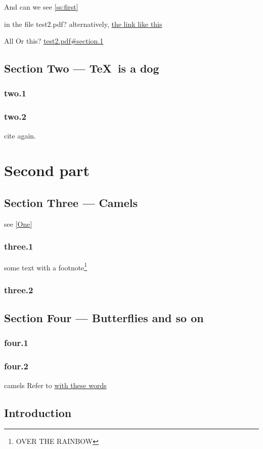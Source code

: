 \documentclass[11pt]{book}
\begin{document}
And can we  see \autoref{ss:first}

in the file test2.pdf? alternatively,
\href{file:test2.pdf#subsection.1.2}{the link like this}

All Or this? \url{test2.pdf#section.1}

\newpage
\section{Section Two --- \TeX\ is a dog}
\subsection{two.1}
\subsection{two.2}
\newpage
cite \cite{Barcelo:1992:caa} again.

\chapter{Second part}
\section{Section Three --- Camels}\label{Three}
see \autoref{One}
\subsection{three.1}
 some text with a footnote\footnote{OVER THE RAINBOW}
\subsection{three.2}

\newpage
\section[Section Four --- Butterflies]{Section Four --- Butterflies and so on}
\subsection{four.1}
\subsection{four.2}
camels
Refer to \hyperref{}{test}{test1}{with these words}
\newpage
\section{Introduction}\label{sec1}
\end{document}
